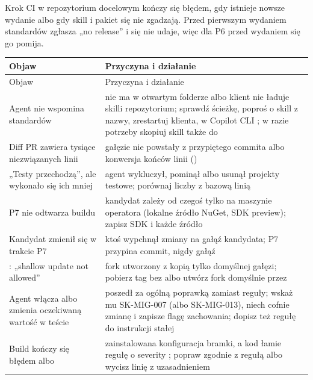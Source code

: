 Krok CI 
w repozytorium docelowym kończy się błędem, gdy istnieje nowsze wydanie albo gdy skill i
pakiet się nie zgadzają. Przed pierwszym wydaniem standardów zgłasza „no release” i się nie
udaje, więc dla P6 przed wydaniem się go pomija.

\begin{xltabular}{\linewidth}{@{}>{\raggedright\arraybackslash}p{5.6cm} >{\raggedright\arraybackslash}X@{}}
\toprule
Objaw & Przyczyna i działanie \\
\midrule
\endfirsthead
\toprule
Objaw & Przyczyna i działanie \\
\midrule
\endhead
Agent nie wspomina standardów &  nie ma w otwartym folderze albo klient nie ładuje skilli repozytorium; sprawdź ścieżkę, poproś o skill z nazwy, zrestartuj klienta, w Copilot CLI ; w razie potrzeby skopiuj skill także do  \\
Diff PR zawiera tysiące niezwiązanych linii & gałęzie nie powstały z przypiętego commita albo konwersja końców linii () \\
„Testy przechodzą”, ale wykonało się ich mniej & agent wykluczył, pominął albo usunął projekty testowe; porównaj liczby z bazową linią \\
P7 nie odtwarza buildu & kandydat zależy od czegoś tylko na maszynie operatora (lokalne źródło NuGet, SDK preview); zapisz SDK i każde źródło \\
Kandydat zmienił się w trakcie P7 & ktoś wypchnął zmiany na gałąź kandydata; P7 przypina commit, nigdy gałąź \\
: „shallow update not allowed” & fork utworzony z kopią tylko domyślnej gałęzi; pobierz tag bez  albo utwórz fork domyślnie przez  \\
Agent włącza  albo zmienia oczekiwaną wartość w teście & poszedł za ogólną poprawką zamiast reguły; wskaż mu SK-MIG-007 (albo SK-MIG-013), niech cofnie zmianę i zapisze flagę zachowania; dopisz też regułę do instrukcji stałej \\
Build kończy się błędem  albo  & zainstalowana konfiguracja bramki, a kod łamie regułę o severity ; popraw zgodnie z regułą albo wycisz linię z uzasadnieniem  \\
\bottomrule
\end{xltabular}

